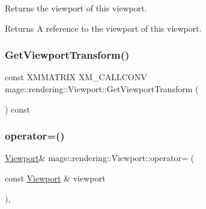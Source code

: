 Returns the viewport of this viewport.

\begin{DoxyReturn}{Returns}
A reference to the viewport of this viewport. 
\end{DoxyReturn}
\hypertarget{classmage_1_1rendering_1_1_viewport_ac4ea113f2c019b5b1d369898537ab5c3}{}\label{classmage_1_1rendering_1_1_viewport_ac4ea113f2c019b5b1d369898537ab5c3} 
\subsubsection{\texorpdfstring{Get\+Viewport\+Transform()}{GetViewportTransform()}}
{\footnotesize\ttfamily const X\+M\+M\+A\+T\+R\+IX X\+M\+\_\+\+C\+A\+L\+L\+C\+O\+NV mage\+::rendering\+::\+Viewport\+::\+Get\+Viewport\+Transform (\begin{DoxyParamCaption}{ }\end{DoxyParamCaption}) const\hspace{0.3cm}{\ttfamily [noexcept]}}

\hypertarget{classmage_1_1rendering_1_1_viewport_afc42613270537b92aa837455b4c154f0}{}\label{classmage_1_1rendering_1_1_viewport_afc42613270537b92aa837455b4c154f0} 
\subsubsection{\texorpdfstring{operator=()}{operator=()}\hspace{0.1cm}{\footnotesize\ttfamily [1/2]}}
{\footnotesize\ttfamily \hyperlink{classmage_1_1rendering_1_1_viewport}{Viewport}\& mage\+::rendering\+::\+Viewport\+::operator= (\begin{DoxyParamCaption}\item[{const \hyperlink{classmage_1_1rendering_1_1_viewport}{Viewport} \&}]{viewport }\end{DoxyParamCaption})\hspace{0.3cm}{\ttfamily [default]}, {\ttfamily [noexcept]}}

\hypertarget{classmage_1_1rendering_1_1_viewport_a62b0439861e78c3718f2b29339ec7226}{}\label{classmage_1_1rendering_1_1_viewport_a62b0439861e78c3718f2b29339ec7226} 
